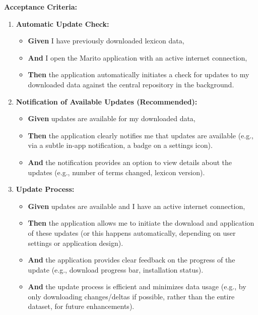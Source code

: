 \documentclass[12pt]{article}
\begin{document}
\vspace{1em}
\textbf{Acceptance Criteria:}
\begin{enumerate}
    \item \textbf{Automatic Update Check:}
    \begin{itemize}
        \item \textbf{Given} I have previously downloaded lexicon data,
        \item \textbf{And} I open the Marito application with an active internet connection,
        \item \textbf{Then} the application automatically initiates a check for updates to my downloaded data against the central repository in the background.
    \end{itemize}

    \item \textbf{Notification of Available Updates (Recommended):}
    \begin{itemize}
        \item \textbf{Given} updates are available for my downloaded data,
        \item \textbf{Then} the application clearly notifies me that updates are available (e.g., via a subtle in-app notification, a badge on a settings icon).
        \item \textbf{And} the notification provides an option to view details about the updates (e.g., number of terms changed, lexicon version).
    \end{itemize}

    \item \textbf{Update Process:}
    \begin{itemize}
        \item \textbf{Given} updates are available and I have an active internet connection,
        \item \textbf{Then} the application allows me to initiate the download and application of these updates (or this happens automatically, depending on user settings or application design).
        \item \textbf{And} the application provides clear feedback on the progress of the update (e.g., download progress bar, installation status).
        \item \textbf{And} the update process is efficient and minimizes data usage (e.g., by only downloading changes/deltas if possible, rather than the entire dataset, for future enhancements).
    \end{itemize}


\end{enumerate}
\end{document}
